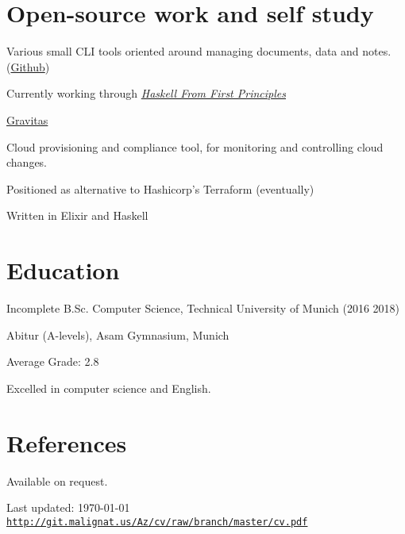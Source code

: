 \documentclass[a4paper]{article}
\def\footerlink{http://git.malignat.us/Az/cv/raw/branch/master/cv.pdf}
\renewenvironment{itemize}{
  \begin{list}{}{
    \setlength{\leftmargin}{1.5em}
  }
}{
  \end{list}
}
\newenvironment{packed}{
\begin{itemize}
  \setlength{\itemsep}{0pt}
  \setlength{\parskip}{0pt}
  \setlength{\parsep}{0pt}
}{\end{itemize}}
\begin{document}
\section*{Open-source work and self study}

\begin{itemize}
  \item Various small CLI tools oriented around managing documents, data and
    notes. (\href{https://github.com/MordecaiMalignatus?utf8=\%E2\%9C\%93\&tab=q\&repositories=\&type=public\&language=}{Github})
  \item Currently working through \href{http://haskellbook.com}{\emph{Haskell From First Principles}}
\item \href{https://github.com/LivewareProblems/gravitas}{Gravitas}
  \begin{packed}
    \item Cloud provisioning and compliance tool, for monitoring and controlling
      cloud changes.
    \item Positioned as alternative to Hashicorp's Terraform (eventually)
    \item Written in Elixir and Haskell
  \end{packed}
\end{itemize}

\section*{Education}

\begin{itemize}
  \item Incomplete B.Sc. Computer Science, Technical University of Munich (2016
    {\textendash} 2018)

  \item Abitur (A-levels), Asam Gymnasium, Munich
	\begin{packed}
	\item Average Grade: 2.8
	\item Excelled in computer science and English.
	\end{packed}
\end{itemize}


\section*{References}
Available on request.

\vfill

\begin{center}
  \begin{footnotesize}
    Last updated: \today \\
    \href{\footerlink}{\texttt{\footerlink}}
  \end{footnotesize}
\end{center}
\end{document}
